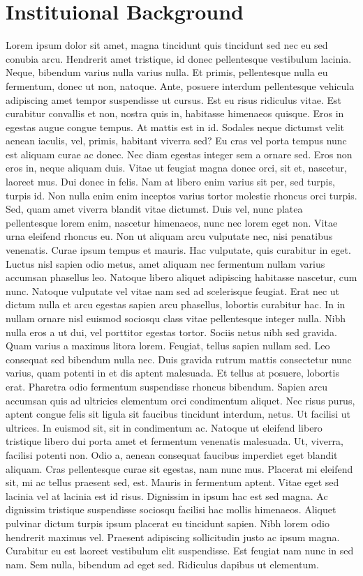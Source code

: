 \documentclass[
  12pt,
]{article}
\begin{document}
\hypertarget{inst}{%
\section{Instituional Background}\label{inst}}

Lorem ipsum dolor sit amet, magna tincidunt quis tincidunt sed nec eu sed conubia arcu. Hendrerit amet tristique, id donec pellentesque vestibulum lacinia. Neque, bibendum varius nulla varius nulla. Et primis, pellentesque nulla eu fermentum, donec ut non, natoque. Ante, posuere interdum pellentesque vehicula adipiscing amet tempor suspendisse ut cursus. Est eu risus ridiculus vitae. Est curabitur convallis et non, nostra quis in, habitasse himenaeos quisque. Eros in egestas augue congue tempus. At mattis est in id. Sodales neque dictumst velit aenean iaculis, vel, primis, habitant viverra sed? Eu cras vel porta tempus nunc est aliquam curae ac donec. Nec diam egestas integer sem a ornare sed. Eros non eros in, neque aliquam duis. Vitae ut feugiat magna donec orci, sit et, nascetur, laoreet mus. Dui donec in felis. Nam at libero enim varius sit per, sed turpis, turpis id. Non nulla enim enim inceptos varius tortor molestie rhoncus orci turpis. Sed, quam amet viverra blandit vitae dictumst. Duis vel, nunc platea pellentesque lorem enim, nascetur himenaeos, nunc nec lorem eget non. Vitae urna eleifend rhoncus eu. Non ut aliquam arcu vulputate nec, nisi penatibus venenatis. Curae ipsum tempus et mauris. Hac vulputate, quis curabitur in eget. Luctus nisl sapien odio metus, amet aliquam nec fermentum nullam varius accumsan phasellus leo. Natoque libero aliquet adipiscing habitasse nascetur, cum nunc. Natoque vulputate vel vitae nam sed ad scelerisque feugiat. Erat nec ut dictum nulla et arcu egestas sapien arcu phasellus, lobortis curabitur hac. In in nullam ornare nisl euismod sociosqu class vitae pellentesque integer nulla. Nibh nulla eros a ut dui, vel porttitor egestas tortor. Sociis netus nibh sed gravida. Quam varius a maximus litora lorem. Feugiat, tellus sapien nullam sed. Leo consequat sed bibendum nulla nec. Duis gravida rutrum mattis consectetur nunc varius, quam potenti in et dis aptent malesuada. Et tellus at posuere, lobortis erat. Pharetra odio fermentum suspendisse rhoncus bibendum. Sapien arcu accumsan quis ad ultricies elementum orci condimentum aliquet. Nec risus purus, aptent congue felis sit ligula sit faucibus tincidunt interdum, netus. Ut facilisi ut ultrices. In euismod sit, sit in condimentum ac. Natoque ut eleifend libero tristique libero dui porta amet et fermentum venenatis malesuada. Ut, viverra, facilisi potenti non. Odio a, aenean consequat faucibus imperdiet eget blandit aliquam. Cras pellentesque curae sit egestas, nam nunc mus. Placerat mi eleifend sit, mi ac tellus praesent sed, est. Mauris in fermentum aptent. Vitae eget sed lacinia vel at lacinia est id risus. Dignissim in ipsum hac est sed magna. Ac dignissim tristique suspendisse sociosqu facilisi hac mollis himenaeos. Aliquet pulvinar dictum turpis ipsum placerat eu tincidunt sapien. Nibh lorem odio hendrerit maximus vel. Praesent adipiscing sollicitudin justo ac ipsum magna. Curabitur eu est laoreet vestibulum elit suspendisse. Est feugiat nam nunc in sed nam. Sem nulla, bibendum ad eget sed. Ridiculus dapibus ut elementum. 
\end{document}

